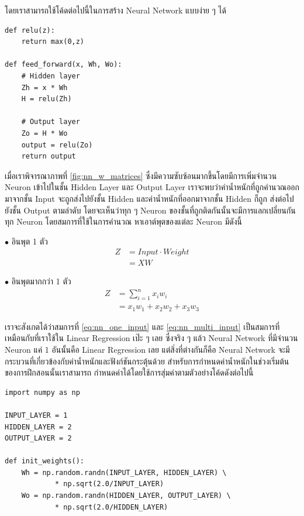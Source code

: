 โดยเราสามารถใช้โค้ดต่อไปนี้ในการสร้าง Neural Network แบบง่าย ๆ ได้

\begin{lstlisting}[style=MyPython]
def relu(z):
    return max(0,z)

def feed_forward(x, Wh, Wo):
    # Hidden layer
    Zh = x * Wh
    H = relu(Zh)

    # Output layer
    Zo = H * Wo
    output = relu(Zo)
    return output
\end{lstlisting}

\vspace{1em}
เมื่อเราพิจารณาภาพที่ \ref{fig:nn_w_matrices} ซึ่งมีความซับซ้อนมากขึ้นโดยมีการเพิ่มจำนวน Neuron เข้าไปในชั้น Hidden Layer และ
Output Layer เราจะพบว่าค่าน้ำหนักที่ถูกคำนวณออกมาจากชั้น Input จะถูกส่งไปยังชั้น Hidden และค่าน้ำหนักที่ออกมาจากชั้น Hidden ก็ถูก%
ส่งต่อไปยังชั้น Output ตามลำดับ โดยจะเห็นว่าทุก ๆ Neuron ของชั้นที่ถูกติดกันนั้นจะมีการแลกเปลี่ยนกันทุก Neuron โดยสมการที่ใช้ในการคำนวณ%
หาเอาต์พุตของแต่ละ Neuron มีดังนี้

\noindent $\bullet$ อินพุต 1 ตัว
\begin{align}\label{eq:nn_one_input}
    Z & = Input \cdot Weight \nonumber \\
      & = X W
\end{align}

\noindent $\bullet$ อินพุตมากกว่า 1 ตัว
\begin{align}\label{eq:nn_multi_input}
    Z & = \sum_{i=1}^{n}x_i w_i \nonumber \\
      & = x_1 w_1 + x_2 w_2 + x_3 w_3
\end{align}

เราจะสังเกตได้ว่าสมการที่ \eqref{eq:nn_one_input} และ \eqref{eq:nn_multi_input} เป็นสมการที่เหมือนกับที่เราใช้ใน Linear
Regression เป๊ะ ๆ เลย ซึ่งจริง ๆ แล้ว Neural Network ที่มีจำนวน Neuron แค่ 1 อันนั้นคือ Linear Regression เลย แต่สิ่งที่ต่างกันก็คือ
Neural Network จะมีกระบวนที่เกี่ยวข้องกับค่าน้ำหนักและฟังก์ชันกระตุ้นด้วย สำหรับการกำหนดค่าน้ำหนักในช่วงเริ่มต้นของการฝึกสอนนั้นเราสามารถ%
กำหนดค่าได้โดยใช้การสุ่มค่าตามตัวอย่างโค้ดดังต่อไปนี้

\begin{lstlisting}[style=MyPython]
import numpy as np

INPUT_LAYER = 1
HIDDEN_LAYER = 2
OUTPUT_LAYER = 2

def init_weights():
    Wh = np.random.randn(INPUT_LAYER, HIDDEN_LAYER) \
            * np.sqrt(2.0/INPUT_LAYER)
    Wo = np.random.randn(HIDDEN_LAYER, OUTPUT_LAYER) \
            * np.sqrt(2.0/HIDDEN_LAYER)
\end{lstlisting}

